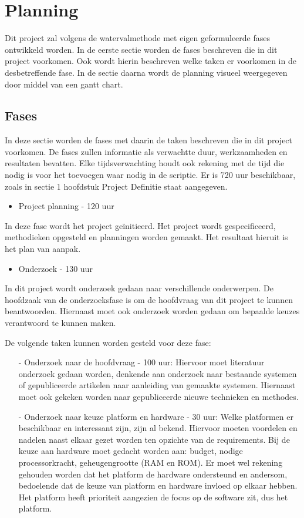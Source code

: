 \section{Planning}
Dit project zal volgens de watervalmethode met eigen geformuleerde fases ontwikkeld worden. In de eerste sectie worden de fases beschreven die in dit project voorkomen. Ook wordt hierin beschreven welke taken er voorkomen in de desbetreffende fase. In de sectie daarna wordt de planning visueel weergegeven door middel van een gantt chart.

\subsection{Fases}
In deze sectie worden de fases met daarin de taken beschreven die in dit project voorkomen. De fases zullen informatie als verwachtte duur, werkzaamheden en resultaten bevatten. Elke tijdsverwachting houdt ook rekening met de tijd die nodig is voor het toevoegen waar nodig in de scriptie. Er is 720 uur beschikbaar, zoals in sectie 1 hoofdstuk Project Definitie staat aangegeven.

\begin{itemize}
\item Project planning - 120 uur
\end{itemize}
In deze fase wordt het project geïnitieerd. Het project wordt gespecificeerd, methodieken opgesteld en planningen worden gemaakt. Het resultaat hieruit is het plan van aanpak.

\begin{itemize}
\item Onderzoek - 130 uur
\end{itemize}
In dit project wordt onderzoek gedaan naar verschillende onderwerpen. De hoofdzaak van de onderzoeksfase is om de hoofdvraag van dit project te kunnen beantwoorden. Hiernaast moet ook onderzoek worden gedaan om bepaalde keuzes verantwoord te kunnen maken.

De volgende taken kunnen worden gesteld voor deze fase:
\begin{itemize}
\item[-] Onderzoek naar de hoofdvraag - 100 uur: Hiervoor moet literatuur onderzoek gedaan worden, denkende aan onderzoek naar bestaande systemen of gepubliceerde artikelen naar aanleiding van gemaakte systemen. Hiernaast moet ook gekeken worden naar gepubliceerde nieuwe technieken en methodes. 

\item[-] Onderzoek naar keuze platform en hardware - 30 uur: Welke platformen er beschikbaar en interessant zijn, zijn al bekend. Hiervoor moeten voordelen en nadelen naast elkaar gezet worden ten opzichte van de requirements. Bij de keuze aan hardware moet gedacht worden aan: budget, nodige processorkracht, geheugengrootte (RAM en ROM). Er moet wel rekening gehouden worden dat het platform de hardware ondersteund en andersom, bedoelende dat de keuze van platform en hardware invloed op elkaar hebben. Het platform heeft prioriteit aangezien de focus op de software zit, dus het platform.
\end{itemize}

